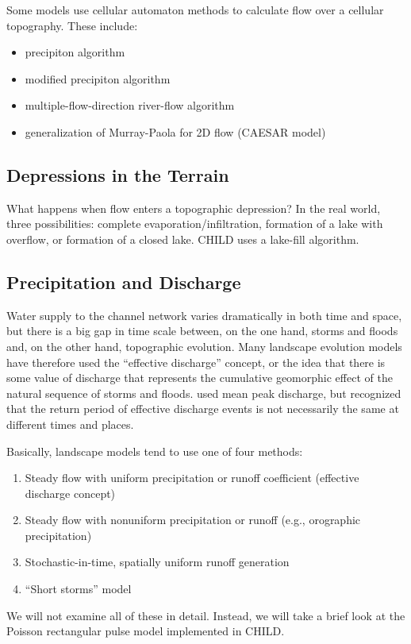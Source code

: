 \documentclass[12pt,reqno]{amsart}
\begin{document}
Some models use cellular automaton methods to calculate flow over a cellular topography. These include:
\begin{itemize}
\item \citet{chase1992fluvial} precipiton algorithm
\item \citet{crave2001stochastic} modified precipiton algorithm
\item \citet{murray1994braid} multiple-flow-direction river-flow algorithm
\item \citet{coulthard1996cellular} generalization of Murray-Paola for 2D flow (CAESAR model)
\end{itemize}

\subsection{Depressions in the Terrain}

What happens when flow enters a topographic depression? In the real world, three possibilities: complete evaporation/infiltration, formation of a lake with overflow, or formation of a closed lake. CHILD uses a lake-fill algorithm. 

\subsection{Precipitation and Discharge}

Water supply to the channel network varies dramatically in both time
and space, but there is a big gap in time scale between, on the one hand, storms and
floods and, on the other hand, topographic evolution. Many landscape
evolution models have therefore used the ``effective discharge''
concept, or the idea that there is some value of discharge that
represents the cumulative geomorphic effect of the natural sequence of
storms and floods. \citet{willgoose1991coupled} used mean peak
discharge, but \citet{huang2006evaluation} recognized that the return
period of effective
discharge events is not necessarily the same at different times and
places.

Basically, landscape models tend to use one of four methods:
\begin{enumerate}
\item Steady flow with uniform precipitation or runoff coefficient (effective discharge concept)
\item Steady flow with nonuniform precipitation or runoff (e.g., orographic precipitation)
\item Stochastic-in-time, spatially uniform runoff generation
\item ``Short storms'' model \citep{solyom2004effect}
\end{enumerate}
We will not examine all of these in detail. Instead, we will take a brief look at the Poisson rectangular pulse model implemented in CHILD.
\end{document}
